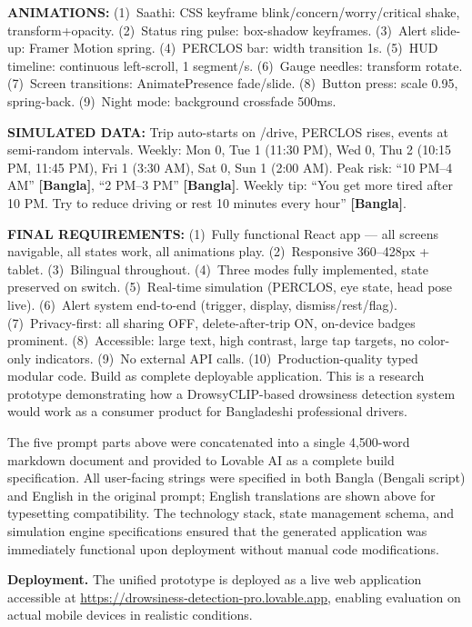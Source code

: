 \documentclass[sigconf]{acmart}
\begin{document}
\begin{promptbox}
\textbf{ANIMATIONS:} (1)~Saathi: CSS keyframe blink/concern/worry/critical shake, transform+opacity. (2)~Status ring pulse: box-shadow keyframes. (3)~Alert slide-up: Framer Motion spring. (4)~PERCLOS bar: width transition 1s. (5)~HUD timeline: continuous left-scroll, 1 segment/s. (6)~Gauge needles: transform rotate. (7)~Screen transitions: AnimatePresence fade/slide. (8)~Button press: scale 0.95, spring-back. (9)~Night mode: background crossfade 500ms.
 
\textbf{SIMULATED DATA:} Trip auto-starts on /drive, PERCLOS rises, events at semi-random intervals. Weekly: Mon 0, Tue 1 (11:30 PM), Wed 0, Thu 2 (10:15 PM, 11:45 PM), Fri 1 (3:30 AM), Sat 0, Sun 1 (2:00 AM). Peak risk: ``10 PM--4 AM'' \textbf{[Bangla]}, ``2 PM--3 PM'' \textbf{[Bangla]}. Weekly tip: ``You get more tired after 10 PM. Try to reduce driving or rest 10 minutes every hour'' \textbf{[Bangla]}.
 
\textbf{FINAL REQUIREMENTS:} (1)~Fully functional React app --- all screens navigable, all states work, all animations play. (2)~Responsive 360--428px + tablet. (3)~Bilingual throughout. (4)~Three modes fully implemented, state preserved on switch. (5)~Real-time simulation (PERCLOS, eye state, head pose live). (6)~Alert system end-to-end (trigger, display, dismiss/rest/flag). (7)~Privacy-first: all sharing OFF, delete-after-trip ON, on-device badges prominent. (8)~Accessible: large text, high contrast, large tap targets, no color-only indicators. (9)~No external API calls. (10)~Production-quality typed modular code. Build as complete deployable application. This is a research prototype demonstrating how a DrowsyCLIP-based drowsiness detection system would work as a consumer product for Bangladeshi professional drivers.
\end{promptbox}

 
\noindent The five prompt parts above were concatenated into a single 4{,}500-word markdown document and provided to Lovable AI as a complete build specification. All user-facing strings were specified in both Bangla (Bengali script) and English in the original prompt; English translations are shown above for typesetting compatibility. The technology stack, state management schema, and simulation engine specifications ensured that the generated application was immediately functional upon deployment without manual code modifications.
 
\textbf{Deployment.} The unified prototype is deployed as a live web application accessible at \url{https://drowsiness-detection-pro.lovable.app}, enabling evaluation on actual mobile devices in realistic conditions.
\end{document}
